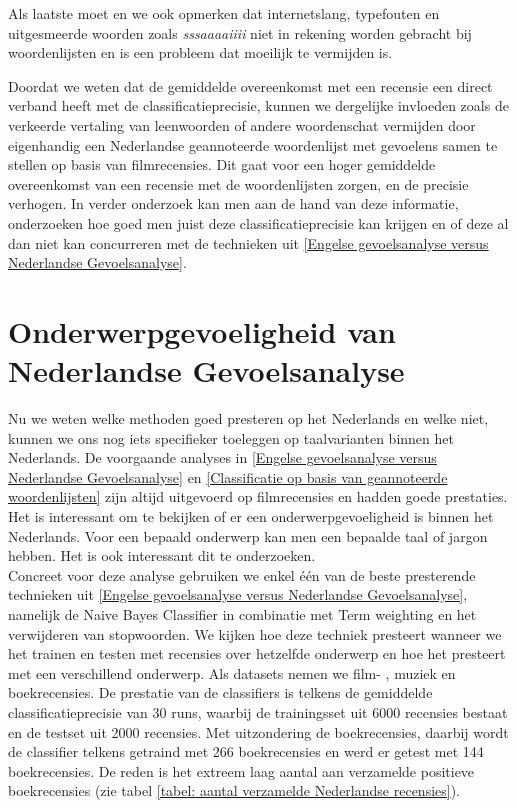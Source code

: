 Als laatste moet en we ook opmerken dat internetslang, typefouten en uitgesmeerde woorden zoals \textit{sssaaaaiiii} niet in rekening worden gebracht bij woordenlijsten en is een probleem dat moeilijk te vermijden is. 

Doordat we weten dat de gemiddelde overeenkomst met een recensie een direct verband heeft met de classificatieprecisie, kunnen we dergelijke invloeden zoals de verkeerde vertaling van leenwoorden of andere woordenschat vermijden door eigenhandig een Nederlandse geannoteerde woordenlijst met gevoelens samen te stellen op basis van filmrecensies. Dit gaat voor een hoger gemiddelde overeenkomst van een recensie met de woordenlijsten zorgen, en de precisie verhogen. In verder onderzoek kan men aan de hand van deze informatie, onderzoeken hoe goed men juist deze classificatieprecisie kan  krijgen en of deze al dan niet kan concurreren met de technieken uit \ref{Engelse gevoelsanalyse versus Nederlandse Gevoelsanalyse}.


\section{Onderwerpgevoeligheid van Nederlandse Gevoelsanalyse}\label{Onderwerpgevoeligheid van Nederlandse Gevoelsanalyse}

Nu we weten welke methoden goed presteren op het Nederlands en welke niet, kunnen we ons nog iets specifieker toeleggen op taalvarianten binnen het Nederlands. De voorgaande analyses in \ref{Engelse gevoelsanalyse versus Nederlandse Gevoelsanalyse} en \ref{Classificatie op basis van geannoteerde woordenlijsten} zijn altijd uitgevoerd op filmrecensies en hadden goede prestaties. Het is interessant om te bekijken of er een onderwerpgevoeligheid is binnen het Nederlands. Voor een bepaald onderwerp kan men een bepaalde taal of jargon hebben. Het is ook interessant dit te onderzoeken. \\

Concreet voor deze analyse gebruiken we enkel \'{e}\'{e}n van de beste presterende technieken uit \ref{Engelse gevoelsanalyse versus Nederlandse Gevoelsanalyse}, namelijk de Naive Bayes Classifier in combinatie met Term weighting en het verwijderen van stopwoorden. We kijken hoe deze techniek presteert wanneer we het trainen en testen met recensies over hetzelfde onderwerp en hoe het presteert met een verschillend onderwerp.  Als datasets nemen we film- , muziek en boekrecensies. De prestatie van de classifiers is telkens de gemiddelde classificatieprecisie van 30 runs, waarbij de trainingsset uit 6000 recensies bestaat en de testset uit 2000 recensies. Met uitzondering de boekrecensies, daarbij wordt de classifier telkens getraind met 266 boekrecensies en werd er getest met 144 boekrecensies. De reden is het extreem laag aantal aan verzamelde positieve boekrecensies (zie tabel \ref{tabel: aantal verzamelde Nederlandse recensies}).\\


